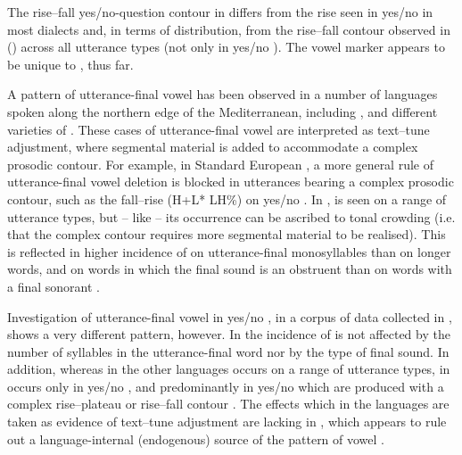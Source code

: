\documentclass[output=paper]{langsci/langscibook}
\begin{document}
The rise--fall yes/no-question contour in  differs from the rise seen in yes/no  in most  dialects \citep{Hellmuthtoappearbook} and, in terms of distribution, from the rise--fall contour observed in  () across all utterance types (not only in yes/no ). The vowel  marker appears to be unique to , thus far.

A pattern of utterance-final vowel  has been observed in a number of  languages spoken along the northern edge of the Mediterranean, including  \citep{GriceEtAl2015}, and different varieties of  \citep{FrotaEtAl2015}. These cases of utterance-final vowel  are interpreted as text--tune adjustment, where segmental material is added to accommodate a complex prosodic contour.  For example, in  Standard European , a more general rule of utterance-final vowel deletion is blocked in utterances bearing a complex prosodic contour, such as the fall--rise (H+L* LH\%) on yes/no  \citep{FrotaEtAl2015}. In ,  is seen on a range of utterance types, but – like  – its occurrence can be ascribed to tonal crowding (i.e. that the complex contour requires more segmental material to be realised). This is reflected in higher incidence of  on utterance-final monosyllables than on longer words, and on words in which the final sound is an obstruent than on words with a final sonorant \citep{GriceEtAl2015}.

Investigation of utterance-final vowel  in  yes/no , in a corpus of data collected in , shows a very different pattern, however. In  the incidence of  is not affected by the number of syllables in the utterance-final word nor by the type of final sound. In addition, whereas in the other  languages  occurs on a range of utterance types, in   occurs only in yes/no , and predominantly in yes/no  which are produced with a complex rise--plateau or rise--fall contour \citep{Hellmuthforthcomingtunisianyesno}. The effects which in the  languages are taken as evidence of text--tune adjustment are lacking in , which appears to rule out a language-internal (endogenous) source of the  pattern of vowel .
\end{document}
